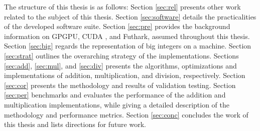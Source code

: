 The structure of this thesis is as follows: Section \ref{sec:rel} presents other
work related to the subject of this thesis. Section \ref{sec:software} details
the practicalities of the developed software suite. Section \ref{sec:pre}
provides the background information on GPGPU, CUDA \cpp, and Futhark, assumed
throughout this thesis. Section \ref{sec:big} regards the representation of big
integers on a machine. Section \ref{sec:strat} outlines the overarching strategy
of the implementations. Sections \ref{sec:add}, \ref{sec:mul}, and \ref{sec:div}
presents the algorithms, optimizations and implementations of addition,
multiplication, and division, respectively. Section \ref{sec:cor} presents the
methodology and results of validation testing. Section \ref{sec:per} benchmarks
and evaluates the performance of the addition and multiplication
implementations, while giving a detailed description of the methodology and
performance metrics. Section \ref{sec:conc} concludes the work of this thesis
and lists directions for future work.

